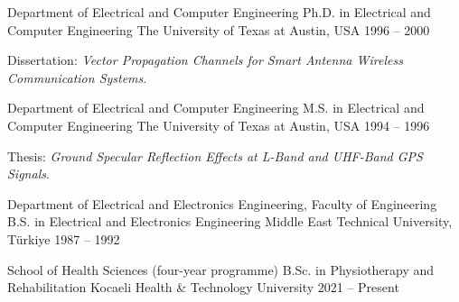 
\begin{cventries}
  \cventry
    {Department of Electrical and Computer Engineering}
    {Ph.D. in Electrical and Computer Engineering}
    {The University of Texas at Austin, USA}
    {1996 -- 2000}
    {\begin{cvitems}
       \item Dissertation: \textit{Vector Propagation Channels for Smart Antenna Wireless Communication Systems}.
     \end{cvitems}}

  \cventry
    {Department of Electrical and Computer Engineering}
    {M.S. in Electrical and Computer Engineering}
    {The University of Texas at Austin, USA}
    {1994 -- 1996}
    {\begin{cvitems}
       \item Thesis: \textit{Ground Specular Reflection Effects at L-Band and UHF-Band GPS Signals}.
     \end{cvitems}}

  \cventry
    {Department of Electrical and Electronics Engineering, Faculty of Engineering}
    {B.S. in Electrical and Electronics Engineering}
    {Middle East Technical University, Türkiye}
    {1987 -- 1992}
    {}

  \cventry
    {School of Health Sciences (four-year programme)}
    {B.Sc. in Physiotherapy and Rehabilitation}
    {Kocaeli Health \& Technology University}
    {2021 -- Present}
    {}
\end{cventries}

\begin{cvskills}
\end{cvskills}
